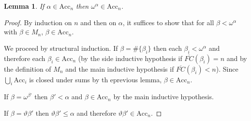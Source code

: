 \documentclass[11pt]{amsart}
\newtheorem{lemma}[theorem]{Lemma}
\theoremstyle{definition}
\begin{document}
\begin{lemma}
  If $\alpha\in\mathrm{Acc}_n$ then $\omega^\alpha\in\mathrm{Acc}_n$.
\end{lemma}
\begin{proof}
  By induction on $n$ and then on $\alpha$, it suffices to show that for all $\beta<\omega^\alpha$ with $\beta\in M_n$, $\beta\in\mathrm{Acc}_n$.

  We proceed by structural induction. If $\beta=\#\{\beta_i\}$ then each $\beta_i<\omega^\alpha$ and therefore each $\beta_i\in\mathrm{Acc}_n$ (by the side inductive hypothesis if $\overline{FC}(\beta_i)=n$ and by the definition of $M_n$ and the main inductive hypothesis if $\overline{FC}(\beta_i)<n$). Since $\bigcup_i\mathrm{Acc}_i$ is closed under sums by th eprevious lemma, $\beta\in\mathrm{Acc}_n$.

  If $\beta=\omega^{\beta'}$ then $\beta'<\alpha$ and $\beta\in\mathrm{Acc}_n$ by the main inductive hypothesis.

  If $\beta=\vartheta\beta'$ then $\vartheta\beta'\leq\alpha$ and therefore $\vartheta\beta'\in\mathrm{Acc}_n$.
\end{proof}
\end{document}

